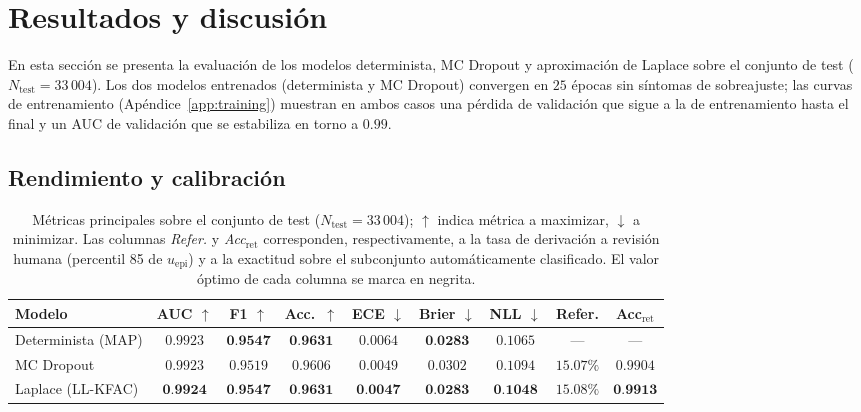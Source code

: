 \documentclass{article}
\begin{document}
\section{Resultados y discusi\'on}
\label{sec:results}

En esta secci\'on se presenta la evaluaci\'on de los modelos
determinista, MC Dropout y aproximaci\'on de Laplace sobre el conjunto
de test ($N_{\mathrm{test}}\!=\!33\,004$). 
Los dos modelos entrenados (determinista y MC Dropout) convergen en $25$ \'epocas sin s\'intomas de
sobreajuste; las curvas de entrenamiento (Ap\'endice~\ref{app:training})
muestran en ambos casos una p\'erdida de validaci\'on que sigue a la de
entrenamiento hasta el final y un AUC de validaci\'on que se estabiliza en torno a $0.99$.

\subsection{Rendimiento y calibraci\'on}
\label{sec:perf-calib}


\begin{table}[t]
  \caption{M\'etricas principales sobre el conjunto de test
           ($N_{\mathrm{test}}\!=\!33\,004$);
           $\uparrow$ indica m\'etrica a maximizar, $\downarrow$ a minimizar.
           Las columnas \emph{Refer.} y \emph{Acc$_{\text{ret}}$}
           corresponden, respectivamente, a la tasa de derivaci\'on a
           revisi\'on humana (percentil 85 de $u_{\mathrm{epi}}$) y a la
           exactitud sobre el subconjunto autom\'aticamente clasificado.
           El valor \'optimo de cada columna se marca en negrita.}
  \label{tab:main}
  \centering
  \small
  \setlength{\tabcolsep}{4.5pt}
  \begin{tabular}{lcccccccc}
    \toprule
    Modelo & AUC $\uparrow$ & F1 $\uparrow$ & Acc.\ $\uparrow$
           & ECE $\downarrow$ & Brier $\downarrow$ & NLL $\downarrow$
           & Refer. & Acc$_{\text{ret}}$ \\
    \midrule
    Determinista (MAP)
       & $0{.}9923$ & $\mathbf{0{.}9547}$ & $\mathbf{0{.}9631}$
       & $0{.}0064$ & $\mathbf{0{.}0283}$ & $0{.}1065$
       & --- & --- \\
    MC Dropout
       & $0{.}9923$ & $0{.}9519$ & $0{.}9606$
       & $0{.}0049$ & $0{.}0302$ & $0{.}1094$
       & $15{.}07\%$ & $0{.}9904$ \\
    Laplace (LL-KFAC)
       & $\mathbf{0{.}9924}$ & $\mathbf{0{.}9547}$ & $\mathbf{0{.}9631}$
       & $\mathbf{0{.}0047}$ & $\mathbf{0{.}0283}$ & $\mathbf{0{.}1048}$
       & $15{.}08\%$ & $\mathbf{0{.}9913}$ \\
    \bottomrule
  \end{tabular}
\end{table}
\end{document}
